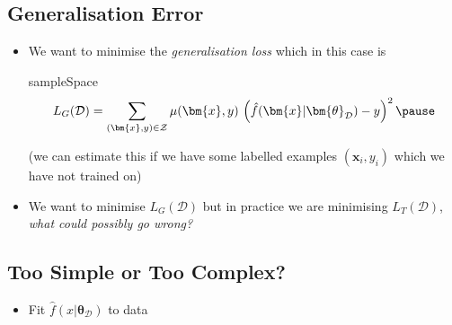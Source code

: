 
\begin{slide}
\section{Generalisation Error}

\begin{PauseHighLight}
  \begin{itemize}
  \item We want to minimise the \textit{generalisation loss} which in
    this case is
    
    \begin{rightImage}{sampleSpace}
      \begin{align*}
        L_G(\mathcal{D}) = \sum_{(\bm{x},y)\in\mathcal{Z}} \mu(\bm{x},y)\,
        \left(\hat{f}(\bm{x}\vert \bm{\theta}_\mathcal{D}) - y
        \right)^2\pause 
      \end{align*}
    \end{rightImage}

    (we can estimate this if we have some labelled examples
    $(\bm{x}_i,y_i)$ which we have not trained on)\pause
  \item We want to minimise $L_G(\mathcal{D})$ but in practice we are
    minimising $L_T(\mathcal{D})$, \textit{what could possibly go wrong?}\pause
  \end{itemize}
\end{PauseHighLight}

\end{slide}


\begin{slide}
\section[-2]{Too Simple or Too Complex?}

\pb
\hypertarget{regression}{}

\begin{itemize}
\item Fit $\hat{f}(x|\bm{\theta}_\mathcal{D})$ to data\pauseh
  \begin{center}
    \pause
  \end{center}
\end{itemize}

\end{slide}


